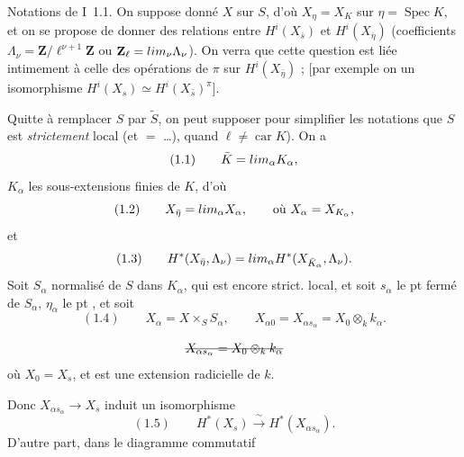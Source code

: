 \documentclass[11pt,a4paper]{article}
\begin{document}
Notations de I~1.1. On suppose donné $X$  sur $S$, d'où $X_\eta = X_K$ sur $\eta = \operatorname{Spec} K$, et on se propose de  donner des relations entre $H^i(X_{\bar s})$ et $H^i(X_{\bar\eta})$ (coefficients $\Lambda_\nu = \mathbf{Z}/\ell^{\nu+1}\mathbf{Z}$ ou $\mathbf{Z}_\ell = \varprojlim_\nu \Lambda_\nu$). On verra que cette question est liée intimement à celle des opérations de $\pi$ sur $H^i(X_{\bar\eta})$ ; [par exemple on \ill{} un isomorphisme $H^i(X_s) \simeq H^i(X_{\bar s})^{\pi}$].

Quitte à remplacer $S$ par $\tilde S$, on peut supposer pour simplifier les notations que $S$ est \emph{strictement} \struck{\ill{}} local (et $=$ …), quand $\ell \neq \operatorname{car} K$). On a
\[
(1.1) \qquad \bar K = \varinjlim_{\alpha} K_\alpha ,
\]
$K_\alpha$ les sous-extensions finies de $K$, d'où
\[
(1.2) \qquad X_{\bar\eta} = \varprojlim_{\alpha} X_\alpha , \qquad \text{où } X_\alpha = X_{K_\alpha},
\]
et
\[
(1.3) \qquad H^*(X_{\bar\eta}, \Lambda_\nu) = \varinjlim_{\alpha} H^*(X_{\bar K_\alpha}, \Lambda_\nu) .
\]
Soit $S_\alpha$   normalisé de $S$ dans $K_\alpha$, qui est encore strict. local, \struck{\ill{}} et soit $s_\alpha$ le pt fermé de $S_\alpha$, $\eta_\alpha$ le pt , et soit
\[
(1.4) \qquad X_\alpha = X \times_S S_\alpha , \qquad X_{\alpha 0} = X_{\alpha s_\alpha} = X_0 \otimes_k k_\alpha .
\]


\[
\text{\struck{$X_{\alpha s_\alpha} = X_0 \otimes_k k_\alpha$}}
\]
où $X_0 = X_s$, et  est une extension  radicielle de $k$.


Donc $X_{\alpha s_\alpha} \to X_s$ induit un isomorphisme 
\[
(1.5) \qquad H^*(X_s) \xrightarrow{\ \sim\ } H^*(X_{\alpha s_\alpha}) .
\]
D'autre part,  dans le diagramme commutatif
\end{document}
